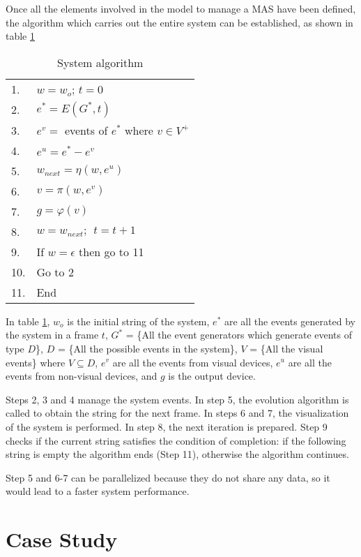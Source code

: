 \documentclass{aamas2012}
\begin{document}
Once all the elements involved in the model to manage a MAS have been defined, the algorithm which carries out the
entire system can be established, as shown in table \ref {tab:SysAlg}


\begin{table}
\centering
\caption{System algorithm}
\label {tab:SysAlg}
\begin{tabular}{|ll|}
    \hline
    1. & $w = w_o$; $t = 0$ \\
    2. & $e^* = E(G^*, t)$ \\
    3. & $e^v =$ events of $e^*$ where $v \in V^+$ \\
    4. & $e^u = e^* - e^v$ \\
    5. & $w_{next} = \eta(w, e^u)$ \\
    6. & $v =  \pi(w, e^v)$ \\
    7. & $g = \varphi(v)$ \\
    8. & $w = w_{next}; \ \ t = t + 1$ \\
    9. & If $w = \epsilon$ then go to 11 \\
    10. & Go to 2 \\
    11. & End \\
\hline
\end{tabular}
\end{table}

In table \ref {tab:SysAlg},  $w_o$ is the initial string of the system,  $e^*$ are all the events generated by the system in a frame $t$, $G^*$ = \{All the event generators which generate events of type $D$\}, $D$ = \{All the possible events in the system\}, $V$ = \{All the visual events\} where $V \subseteq D$, $e^v$ are all the events from visual devices, $e^u$ are all the events from non-visual devices, and $g$ is the output device.


Steps 2, 3 and 4 manage the system events. In step 5, the evolution algorithm is called to obtain the
string for the next frame. In steps 6 and 7, the visualization of the system is performed.
In step 8, the next iteration
is prepared. Step 9 checks if the current string satisfies the condition of completion: if the
following string is empty the algorithm ends (Step 11), otherwise the algorithm continues.

Step 5 and 6-7 can be parallelized because they do not share any data, so it would lead
to a faster system performance.


\section{Case Study
\label{sec:case_study}}
\end{document}
